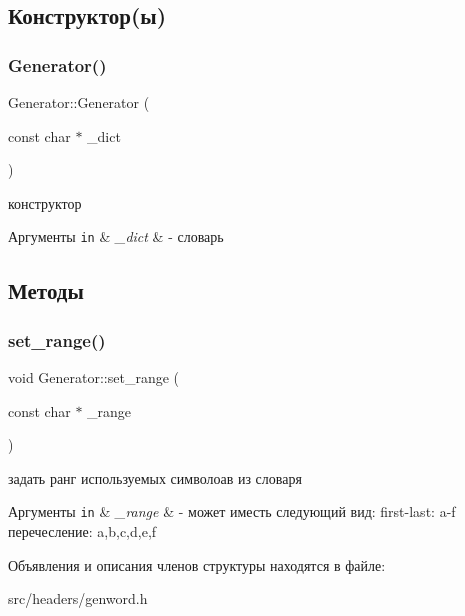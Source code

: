 \subsection{Конструктор(ы)}
\mbox{\label{struct_generator_a9967a0cb13e43132978c35543c2bbc9d}} 
\subsubsection{\texorpdfstring{Generator()}{Generator()}}
{\footnotesize\ttfamily Generator\+::\+Generator (\begin{DoxyParamCaption}\item[{const char $\ast$}]{\+\_\+dict }\end{DoxyParamCaption})}



конструктор 


\begin{DoxyParams}[1]{Аргументы}
\mbox{\tt in}  & {\em \+\_\+dict} & -\/ словарь \\
\hline
\end{DoxyParams}


\subsection{Методы}
\mbox{\label{struct_generator_ac7602c8323c11fb1248cf6c464b80a58}} 
\subsubsection{\texorpdfstring{set\+\_\+range()}{set\_range()}}
{\footnotesize\ttfamily void Generator\+::set\+\_\+range (\begin{DoxyParamCaption}\item[{const char $\ast$}]{\+\_\+range }\end{DoxyParamCaption})}



задать ранг используемых символоав из словаря 


\begin{DoxyParams}[1]{Аргументы}
\mbox{\tt in}  & {\em \+\_\+range} & -\/ может иместь следующий вид\+: first-\/last\+: a-\/f перечесление\+: a,b,c,d,e,f \\
\hline
\end{DoxyParams}


Объявления и описания членов структуры находятся в файле\+:\begin{DoxyCompactItemize}
\item 
src/headers/genword.\+h\end{DoxyCompactItemize}
